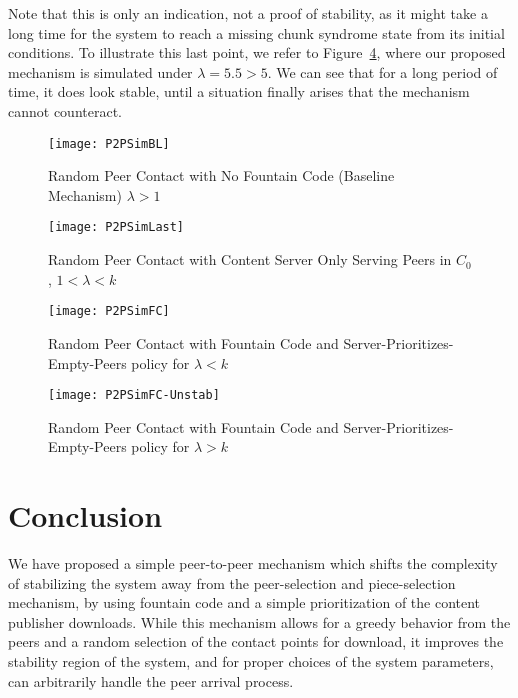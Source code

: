 \documentclass[11pt,conference]{IEEEtran}
\begin{document}
Note that this is only an indication, not a proof of stability, as it might take a long time for the system to reach a missing chunk syndrome state from its initial conditions. To illustrate this last point, we refer to Figure~\ref{fig:p2psimfc-unstab}, where our proposed mechanism is simulated under $\lambda = 5.5 > 5$. We can see that for a long period of time, it does look stable, until a situation finally arises that the mechanism cannot counteract.

\begin{figure}[!t]
\centering
\texttt{[image: P2PSimBL]}
\caption{Random Peer Contact with No Fountain Code (Baseline Mechanism) $\lambda > 1$}
\label{fig:p2psimbl}
\end{figure}

\begin{figure}[!t]
\centering
\texttt{[image: P2PSimLast]}
\caption{Random Peer Contact with Content Server Only Serving Peers in $C_0$, $1 < \lambda < k$}
\label{fig:p2psimlast}
\end{figure}

\begin{figure}[!t]
\centering
\texttt{[image: P2PSimFC]}
\caption{Random Peer Contact with Fountain Code and Server-Prioritizes-Empty-Peers policy for $\lambda<k$}
\label{fig:p2psimfc}
\end{figure}


\begin{figure}[!t]
\centering
\texttt{[image: P2PSimFC-Unstab]}
\caption{Random Peer Contact with Fountain Code and Server-Prioritizes-Empty-Peers policy for $\lambda>k$}
\label{fig:p2psimfc-unstab}
\end{figure}

\section{Conclusion}
\label{sec:con}

We have proposed a simple peer-to-peer mechanism which shifts the complexity of stabilizing the system away from the peer-selection and piece-selection mechanism, by using fountain code and a simple prioritization of the content publisher downloads. While this mechanism allows for a greedy behavior from the peers and a random selection of the contact points for download, it improves the stability region of the system, and for proper choices of the system parameters, can arbitrarily handle the peer arrival process.
\end{document}
